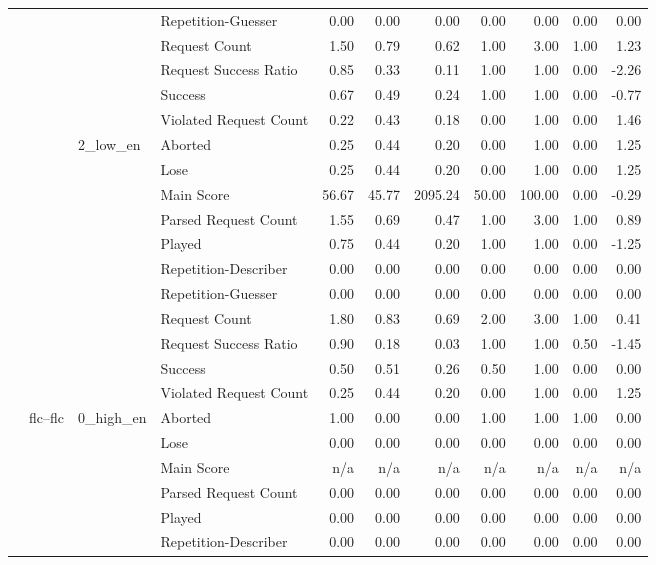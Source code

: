 \begin{tabular}{llllrrrrrrr}
 &  &  & Repetition-Guesser & 0.00 & 0.00 & 0.00 & 0.00 & 0.00 & 0.00 & 0.00 \\
 &  &  & Request Count & 1.50 & 0.79 & 0.62 & 1.00 & 3.00 & 1.00 & 1.23 \\
 &  &  & Request Success Ratio & 0.85 & 0.33 & 0.11 & 1.00 & 1.00 & 0.00 & -2.26 \\
 &  &  & Success & 0.67 & 0.49 & 0.24 & 1.00 & 1.00 & 0.00 & -0.77 \\
 &  &  & Violated Request Count & 0.22 & 0.43 & 0.18 & 0.00 & 1.00 & 0.00 & 1.46 \\
\cline{3-11}
 &  & \multirow[t]{11}{*}{2_low_en} & Aborted & 0.25 & 0.44 & 0.20 & 0.00 & 1.00 & 0.00 & 1.25 \\
 &  &  & Lose & 0.25 & 0.44 & 0.20 & 0.00 & 1.00 & 0.00 & 1.25 \\
 &  &  & Main Score & 56.67 & 45.77 & 2095.24 & 50.00 & 100.00 & 0.00 & -0.29 \\
 &  &  & Parsed Request Count & 1.55 & 0.69 & 0.47 & 1.00 & 3.00 & 1.00 & 0.89 \\
 &  &  & Played & 0.75 & 0.44 & 0.20 & 1.00 & 1.00 & 0.00 & -1.25 \\
 &  &  & Repetition-Describer & 0.00 & 0.00 & 0.00 & 0.00 & 0.00 & 0.00 & 0.00 \\
 &  &  & Repetition-Guesser & 0.00 & 0.00 & 0.00 & 0.00 & 0.00 & 0.00 & 0.00 \\
 &  &  & Request Count & 1.80 & 0.83 & 0.69 & 2.00 & 3.00 & 1.00 & 0.41 \\
 &  &  & Request Success Ratio & 0.90 & 0.18 & 0.03 & 1.00 & 1.00 & 0.50 & -1.45 \\
 &  &  & Success & 0.50 & 0.51 & 0.26 & 0.50 & 1.00 & 0.00 & 0.00 \\
 &  &  & Violated Request Count & 0.25 & 0.44 & 0.20 & 0.00 & 1.00 & 0.00 & 1.25 \\
\cline{2-11} \cline{3-11}
 & \multirow[t]{33}{*}{flc--flc} & \multirow[t]{11}{*}{0_high_en} & Aborted & 1.00 & 0.00 & 0.00 & 1.00 & 1.00 & 1.00 & 0.00 \\
 &  &  & Lose & 0.00 & 0.00 & 0.00 & 0.00 & 0.00 & 0.00 & 0.00 \\
 &  &  & Main Score & n/a & n/a & n/a & n/a & n/a & n/a & n/a \\
 &  &  & Parsed Request Count & 0.00 & 0.00 & 0.00 & 0.00 & 0.00 & 0.00 & 0.00 \\
 &  &  & Played & 0.00 & 0.00 & 0.00 & 0.00 & 0.00 & 0.00 & 0.00 \\
 &  &  & Repetition-Describer & 0.00 & 0.00 & 0.00 & 0.00 & 0.00 & 0.00 & 0.00 \\

\end{tabular}
